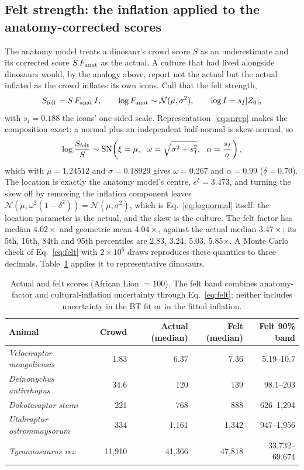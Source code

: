 \documentclass[11pt]{article}
\begin{document}
\subsection{Felt strength: the inflation applied to the anatomy-corrected scores}
The anatomy model treats a dinosaur's crowd score $S$ as an underestimate and its corrected score $S\,F_{\rm anat}$ as the actual. A culture that had lived alongside dinosaurs would, by the analogy above, report not the actual but the actual inflated as the crowd inflates its own icons. Call that the felt strength,
\begin{equation}
S_{\rm felt}=S\,F_{\rm anat}\,I,\qquad \log F_{\rm anat}\sim\mathcal N(\mu,\sigma^2),\qquad \log I=s_I|Z_0| ,
\end{equation}
with $s_I=0.188$ the icons' one-sided scale. Representation~\eqref{eq:snrep} makes the composition exact: a normal plus an independent half-normal is skew-normal, so
\begin{equation}
\log\frac{S_{\rm felt}}{S}\sim\mathrm{SN}\!\left(\xi=\mu,\ \ \omega=\sqrt{\sigma^2+s_I^2},\ \ \alpha=\frac{s_I}{\sigma}\right),
\label{eq:felt}
\end{equation}
which with $\mu=1.24512$ and $\sigma=0.18929$ gives $\omega=0.267$ and $\alpha=0.99$ ($\delta=0.70$). The location is exactly the anatomy model's centre, $e^{\xi}=3.473$, and turning the skew off by removing the inflation component leaves $\mathcal N(\mu,\omega^2(1-\delta^2))=\mathcal N(\mu,\sigma^2)$, which is Eq.~\eqref{eq:lognormal} itself: the location parameter is the actual, and the skew is the culture. The felt factor has median $4.02\times$ and geometric mean $4.04\times$, against the actual median $3.47\times$; its 5th, 16th, 84th and 95th percentiles are 2.83, 3.24, 5.03, 5.85$\times$. A Monte Carlo check of Eq.~\eqref{eq:felt} with $2\times10^6$ draws reproduces these quantiles to three decimals. Table~\ref{tab:felt} applies it to representative dinosaurs.

\begin{table}[H]
\centering
\small
\begin{tabular}{lrrrr}
\toprule
Animal & Crowd & Actual (median) & Felt (median) & Felt 90\% band \\
\midrule
\textit{Velociraptor mongoliensis} & 1.83 & 6.37 & 7.36 & 5.19--10.7 \\
\textit{Deinonychus antirrhopus} & 34.6 & 120 & 139 & 98.1--203 \\
\textit{Dakotaraptor steini} & 221 & 768 & 888 & 626--1,294 \\
\textit{Utahraptor ostrommaysorum} & 334 & 1,161 & 1,342 & 947--1,956 \\
\textit{Tyrannosaurus rex} & 11,910 & 41,366 & 47,818 & 33,732--69,674 \\
\bottomrule
\end{tabular}
\caption{Actual and felt scores (African Lion $=100$). The felt band combines anatomy-factor and cultural-inflation uncertainty through Eq.~\eqref{eq:felt}; neither includes uncertainty in the BT fit or in the fitted inflation.}
\label{tab:felt}
\end{table}
\end{document}
